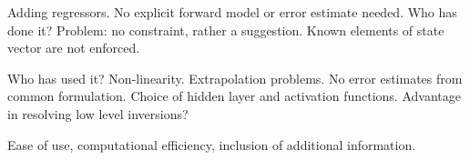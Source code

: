     \startsubsection[title=Including Additional Information]

        Adding regressors. No explicit forward model or error estimate needed.
        Who has done it? Problem: no constraint, rather a suggestion. Known
        elements of state vector are not enforced.

    \stopsubsection
    
\stopsection


\startsection[title=Neural Network Regression]

    Who has used it? Non-linearity. Extrapolation problems. No error estimates
    from common formulation. Choice of hidden layer and activation functions.
    Advantage in resolving low level inversions?

\stopsection


\startsection[title=Comparison of Techniques]

    Ease of use, computational efficiency, inclusion of additional information.

\stopsection

